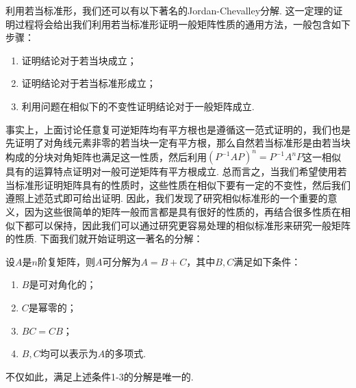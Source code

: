 利用若当标准形，我们还可以有以下著名的Jordan-Chevalley分解. 这一定理的证明过程将会给出我们利用若当标准形证明一般矩阵性质的通用方法，一般包含如下步骤：
\begin{enumerate}
    \item 证明结论对于若当块成立；
    \item 证明结论对于若当标准形成立；
    \item 利用问题在相似下的不变性证明结论对于一般矩阵成立.
\end{enumerate}

事实上，上面讨论任意复可逆矩阵均有平方根也是遵循这一范式证明的，我们也是先证明了对角线元素非零的若当块一定有平方根，那么自然若当标准形是由若当块构成的分块对角矩阵也满足这一性质，然后利用$(P^{-1}AP)^n=P^{-1}A^nP$这一相似具有的运算特点证明对一般可逆矩阵有平方根成立. 总而言之，当我们希望使用若当标准形证明矩阵具有的性质时，这些性质在相似下要有一定的不变性，然后我们遵照上述范式即可给出证明. 因此，我们发现了研究相似标准形的一个重要的意义，因为这些很简单的矩阵一般而言都是具有很好的性质的，再结合很多性质在相似下都可以保持，因此我们可以通过研究更容易处理的相似标准形来研究一般矩阵的性质. 下面我们就开始证明这一著名的分解：

\begin{theorem}
    设$A$是$n$阶复矩阵，则$A$可分解为$A=B+C$，其中$B,C$满足如下条件：
    \begin{enumerate}
        \item $B$是可对角化的；
        \item $C$是幂零的；
        \item $BC=CB$；
        \item $B,C$均可以表示为$A$的多项式.
    \end{enumerate}
    不仅如此，满足上述条件1-3的分解是唯一的.
\end{theorem}

